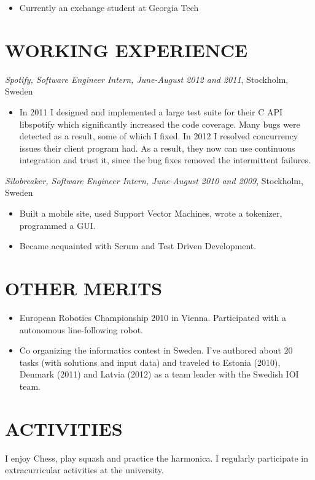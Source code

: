\documentclass[11pt]{res} %
\begin{document}
\begin{resume}
\begin{itemize}
   \item Currently an exchange student at Georgia Tech
 \end{itemize}

\section{WORKING EXPERIENCE}
\emph{Spotify, Software Engineer Intern, June-August 2012 and 2011}, Stockholm, Sweden
\vspace{0.2in}
   \begin{itemize} %
   \item In 2011 I designed and implemented a large test suite for their C API
     libspotify which significantly increased the code coverage. Many bugs were
     detected as a result, some of which I fixed. In 2012 I resolved
     concurrency issues their client program had. As a result, they now can use
     continuous integration and trust it, since the bug fixes removed the
     intermittent failures.

 \end{itemize}


\emph{Silobreaker, Software Engineer Intern, June-August 2010 and 2009}, Stockholm, Sweden
\vspace{0.2in}
 \begin{itemize} %
  \item Built a mobile site, used Support Vector Machines, wrote a tokenizer,
   programmed a GUI.
  \item Became acquainted with Scrum and Test Driven Development.
\end{itemize}

\section{OTHER MERITS}

   \begin{itemize} %
   \item European Robotics Championship 2010 in Vienna.
    Participated with a autonomous line-following robot.
   \item Co organizing the informatics contest in Sweden.  I've authored about
     20 tasks (with solutions and input data) and traveled to Estonia (2010),
     Denmark (2011) and Latvia (2012) as a team leader with the Swedish IOI
     team.
 \end{itemize}

\section{ACTIVITIES}

I enjoy Chess, play squash and practice the harmonica.
I regularly participate in extracurricular
activities at the university.


\end{resume}
\end{document}
